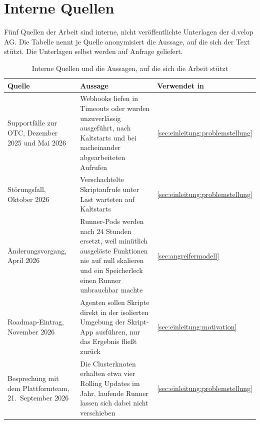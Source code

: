 \section{Interne Quellen}
\label{anh:intern}

Fünf Quellen der Arbeit sind interne, nicht veröffentlichte Unterlagen der d.velop AG. Die Tabelle nennt je Quelle
anonymisiert die Aussage, auf die sich der Text stützt. Die Unterlagen selbst werden auf Anfrage geliefert.

\begin{table}[H]
  \caption{Interne Quellen und die Aussagen, auf die sich die Arbeit stützt}
  \label{tab:intern}
  \small
  \begin{tabularx}{\textwidth}{@{}>{\RaggedRight\arraybackslash}p{} >{\RaggedRight\arraybackslash}X >{\RaggedRight\arraybackslash}p{}@{}}
    \hline
    Quelle & Aussage & Verwendet in \\
    \hline
    Supportfälle zur \acs{OTC}, Dezember 2025 und Mai 2026 \autocite{intern_supportfaelle_otc_2026} & Webhooks liefen in
      Timeouts oder wurden unzuverlässig ausgeführt, nach Kaltstarts und bei nacheinander abgearbeiteten Aufrufen &
      \autoref{sec:einleitung:problemstellung} \\
    Störungsfall, Oktober 2026 \autocite{intern_stoerungsfall_2026} & Verschachtelte Skriptaufrufe unter Last warteten
      auf Kaltstarts & \autoref{sec:einleitung:problemstellung} \\
    Änderungsvorgang, April 2026 \autocite{intern_runner_ersatz_2026} & Runner-Pods werden nach 24 Stunden ersetzt, weil
      minütlich ausgelöste Funktionen nie auf null skalieren und ein Speicherleck einen Runner unbrauchbar machte &
      \autoref{sec:angreifermodell} \\
    Roadmap-Eintrag, November 2026 \autocite{intern_code_mode_2026} & Agenten sollen Skripte direkt in der isolierten
      Umgebung der Skript-App ausführen, nur das Ergebnis fließt zurück & \autoref{sec:einleitung:motivation} \\
    Besprechung mit dem Plattformteam, 21.\ September 2026 \autocite{intern_ddp_updates_2026} & Die Clusterknoten
      erhalten etwa vier Rolling Updates im Jahr, laufende Runner lassen sich dabei nicht verschieben &
      \autoref{sec:einleitung:problemstellung} \\
    \hline
  \end{tabularx}
\end{table}
